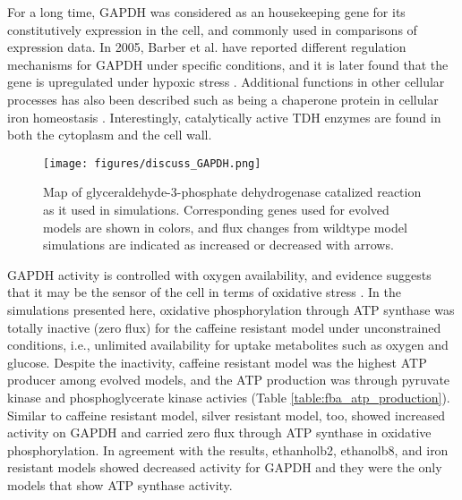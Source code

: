 For a long time, GAPDH was considered as an housekeeping gene for its constitutively expression in the cell, and commonly used in comparisons of expression data. In 2005, Barber et al. have reported different regulation mechanisms for GAPDH under specific conditions\cite{barber2005gapdh}, and it is later found that the gene is upregulated under hypoxic stress \cite{yang2008effects}. Additional functions in other cellular processes has also been described such as being a chaperone protein in cellular iron homeostasis \cite{sweeny2018glyceraldehyde}. Interestingly, catalytically active TDH enzymes are found in both the cytoplasm and the cell wall.



\begin{figure}[H]
\texttt{[image: figures/discuss\_GAPDH.png]}
\caption[Map of glyceraldehyde-3-phosphate dehydrogenase catalized reaction as it used in simulations]{Map of glyceraldehyde-3-phosphate dehydrogenase catalized reaction as it used in simulations. Corresponding genes used for evolved models are shown in colors, and flux changes from wildtype model simulations are indicated as increased or decreased with arrows.}
\label{fig:discuss_GAPDH}
\end{figure}

GAPDH activity is controlled with oxygen availability, and evidence suggests that it may be the sensor of the cell in terms of oxidative stress \cite{chuang2005glyceraldehyde}. In the simulations presented here, oxidative phosphorylation through ATP synthase was totally inactive (zero flux) for the caffeine resistant model under unconstrained conditions, i.e., unlimited availability for uptake metabolites such as oxygen and glucose. Despite the inactivity, caffeine resistant model was the highest ATP producer among evolved models, and the ATP production was through pyruvate kinase and phosphoglycerate kinase activies (Table \ref{table:fba_atp_production}). Similar to caffeine resistant model, silver resistant model, too, showed increased activity on GAPDH and carried zero flux through ATP synthase in oxidative phosphorylation. In agreement with the results, ethanholb2, ethanolb8, and iron resistant models showed decreased activity for GAPDH and they were the only models that show ATP synthase activity.



